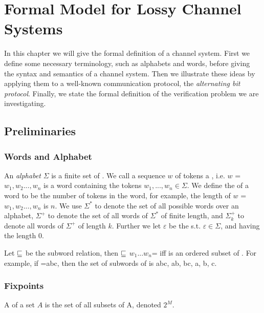 \section{Formal Model for Lossy Channel Systems}
\label{definitions}
In this chapter we will give the formal definition of a channel system. First we define some necessary terminology, such as alphabets and words, before giving the syntax and semantics of a channel system. Then we illustrate these ideas by applying them to a well-known communication protocol, the \emph{alternating bit protocol}. Finally, we state the formal definition of the verification problem we are investigating.

\subsection{Preliminaries}
\subsubsection{Words and Alphabet}
An \emph{alphabet} $\Sigma$ is a finite set of . We call a sequence $w$ of tokens a , i.e. $w$ = $w_1, w_2..., w_n$ is a word containing the tokens $w_1,...,w_n \in \Sigma$. We define the  of a word to be the number of tokens in the word, for example, the length of $w$ = $w_1, w_2..., w_n$ is $n$. We use $\Sigma^*$ to denote the set of all possible words over an alphabet, $\Sigma^+$ to denote the set of all words of $\Sigma^*$ of finite length, and $\Sigma_k^+$ to denote all words of $\Sigma^+$ of length  $k$. Further we let $\varepsilon$ be the  s.t. $\varepsilon \in \Sigma$, and having the length 0.


Let $\sqsubseteq$ be the subword relation, then  $\sqsubseteq$ $w_1...w_n$= iff  is an ordered subset of . For example, if =abc, then the set of subwords of  is {abc, ab, bc, a, b, c}.

\subsubsection{Fixpoints}
A  of a set $A$ is the set of all subsets of A, denoted $2^M$.

